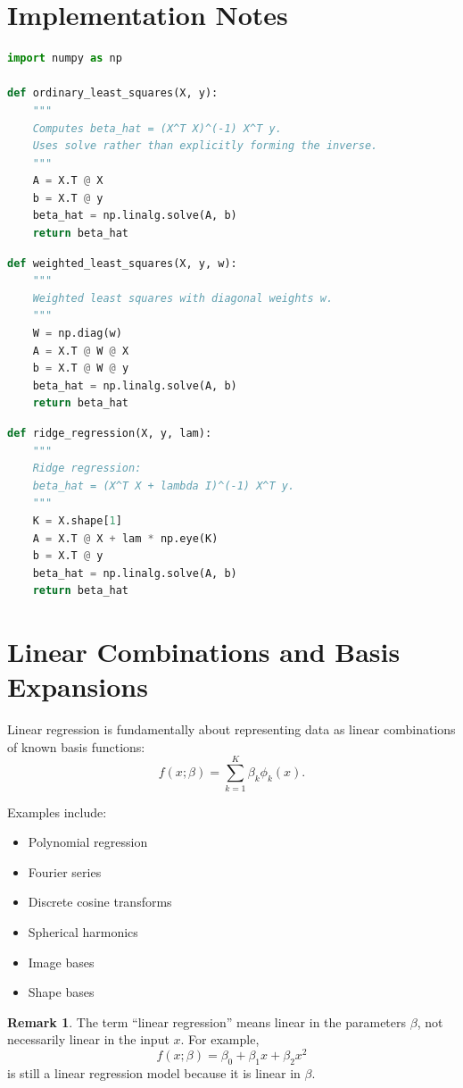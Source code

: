 \documentclass[12pt,oneside]{book}
\numberwithin{equation}{section}
\theoremstyle{definition}
\newtheorem{remark}{Remark}[section]
\theoremstyle{plain}
\theoremstyle{remark}
\begin{document}
\section{Implementation Notes}

\begin{lstlisting}[language=Python]
import numpy as np

def ordinary_least_squares(X, y):
    """
    Computes beta_hat = (X^T X)^(-1) X^T y.
    Uses solve rather than explicitly forming the inverse.
    """
    A = X.T @ X
    b = X.T @ y
    beta_hat = np.linalg.solve(A, b)
    return beta_hat
\end{lstlisting}

\begin{lstlisting}[language=Python]
def weighted_least_squares(X, y, w):
    """
    Weighted least squares with diagonal weights w.
    """
    W = np.diag(w)
    A = X.T @ W @ X
    b = X.T @ W @ y
    beta_hat = np.linalg.solve(A, b)
    return beta_hat
\end{lstlisting}

\begin{lstlisting}[language=Python]
def ridge_regression(X, y, lam):
    """
    Ridge regression:
    beta_hat = (X^T X + lambda I)^(-1) X^T y.
    """
    K = X.shape[1]
    A = X.T @ X + lam * np.eye(K)
    b = X.T @ y
    beta_hat = np.linalg.solve(A, b)
    return beta_hat
\end{lstlisting}

\section{Linear Combinations and Basis Expansions}

Linear regression is fundamentally about representing data as linear combinations of known basis functions:
\[
f(x;\beta)
=
\sum_{k=1}^K \beta_k\phi_k(x).
\]

Examples include:
\begin{itemize}
    \item Polynomial regression
    \item Fourier series
    \item Discrete cosine transforms
    \item Spherical harmonics
    \item Image bases
    \item Shape bases
\end{itemize}

\begin{remark}
The term ``linear regression'' means linear in the parameters $\beta$, not necessarily linear in the input $x$. For example,
\[
f(x;\beta)=\beta_0+\beta_1x+\beta_2x^2
\]
is still a linear regression model because it is linear in $\beta$.
\end{remark}
\end{document}
